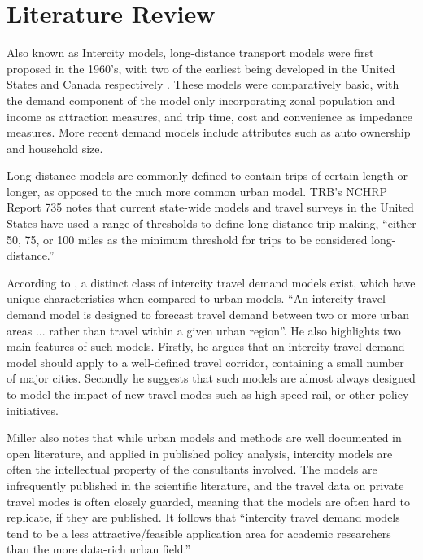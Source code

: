 \chapter{Literature Review}
Also known as Intercity models, long-distance transport models were first proposed in the 1960’s, with two of the earliest being developed in the United States and Canada respectively \parencite{CTC71}. These models were comparatively basic, with the demand component of the model only incorporating zonal population and income as attraction measures, and trip time, cost and convenience as impedance measures. More recent demand models include attributes such as auto ownership and household size. 

Long-distance models are commonly defined to contain trips of certain length or longer, as opposed to the much more common urban model. TRB's NCHRP Report 735 notes that current state-wide models and travel surveys in the United States have used a range of thresholds to define long-distance trip-making, \enquote{either 50, 75, or 100 miles as the minimum threshold for trips to be considered long-distance.}\autocite{schif12}

According to \textcite{miller04}, a distinct class of intercity travel demand models exist, which have unique characteristics when compared to urban models. \enquote{An intercity travel demand model is designed to forecast travel demand between two or more urban areas ... rather than travel within a given urban region}. He also highlights two main features of such models. Firstly, he argues that an intercity travel demand model should apply to a well-defined travel corridor, containing a small number of major cities. Secondly he suggests that such models are almost always designed to model the impact of new travel modes such as high speed rail, or other policy initiatives.

Miller also notes that while urban models and methods are well documented in open literature, and applied in published policy analysis, intercity models are often the intellectual property of the consultants involved. The models are infrequently published in the scientific literature, and the travel data on private travel modes is often closely guarded, meaning that the models are often hard to replicate, if they are published. It follows that \enquote{intercity travel demand models tend to be a less attractive/feasible application area for academic researchers than the more data-rich urban field.} \parencite{miller04}

